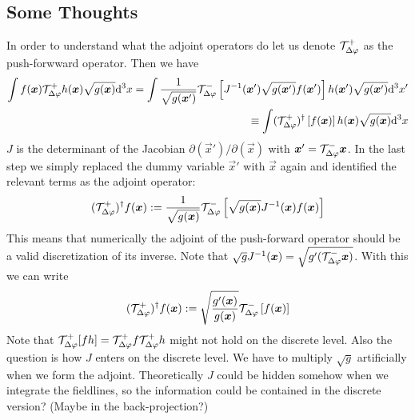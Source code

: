 \subsection{Some Thoughts}
In order to understand what the adjoint operators do let us denote $\mathcal T^+_{\Delta\varphi}$ as the push-forwward operator. Then we have
\begin{align}
    \int f(\vec x) \Tp h(\vec x) \sqrt{g(\vec x)}\d^3x%
    =  \int \frac{1}{\sqrt{g(\vec x')}}\Tm\left[J^{-1}(\vec x')\sqrt{g(\vec x')}f(\vec x')\right] h(\vec x')\sqrt{g(\vec x')}   \d^3x' \nonumber \\
    \equiv  \int (\Tp)^\dagger\left[f(\vec x)\right] h(\vec x)\sqrt{g(\vec x)}   \d^3x
    \label{}
\end{align}
$J$ is the determinant of the Jacobian $\partial(\vec x')/\partial(\vec x)$ with ${\boldsymbol{x}}' = \mathcal T^-_{\Delta\varphi} {\boldsymbol{x}}$.
In the last step we simply replaced the dummy variable $\vec x'$ with $\vec x$ again and identified the relevant terms
as the adjoint operator:
\begin{align}
    (\mathcal T^+_{\Delta\varphi})^\dagger f({\boldsymbol{x}} ) := \frac{1}{\sqrt{g({\boldsymbol{x}})}} \mathcal T^-_{\Delta\varphi}\left[\sqrt{g({\boldsymbol{x}})} J^{-1}({\boldsymbol{x}}) f({\boldsymbol{x}}) \right]
    \label{}
\end{align}
This means that numerically the adjoint of the push-forward
operator should be a valid discretization of its inverse.
Note that $\sqrt{g}J^{-1}({\boldsymbol{x}}) = \sqrt{g'(\mathcal T^-_{\Delta\varphi} {\boldsymbol{x}})}$.
With this we can write
\begin{align}
    (\mathcal T^+_{\Delta\varphi})^\dagger f({\boldsymbol{x}} ) := \sqrt{\frac{g'({\boldsymbol{x}})}{g({\boldsymbol{x}})}} \mathcal T^-_{\Delta\varphi}\left[f({\boldsymbol{x}}) \right]
    \label{}
\end{align}
Note that $\mathcal T^+_{\Delta\varphi} [fh] = \mathcal T^+_{\Delta\varphi} f \mathcal T^+_{\Delta\varphi} h$ might not
hold on the discrete level. Also the question is how $J$ enters
on the discrete level. We have to multiply $\sqrt{g}$ artificially when we form the adjoint.
Theoretically $J$ could be hidden somehow when we integrate the fieldlines, so the information could be contained in the discrete version? (Maybe in the back-projection?)

